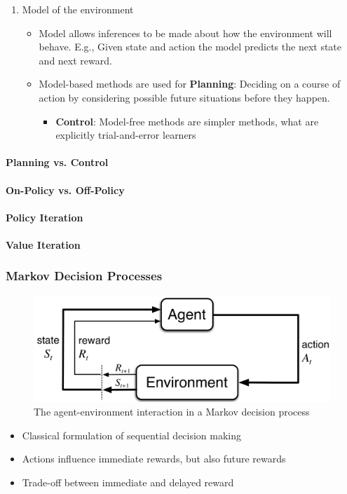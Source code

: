 \documentclass[a4paper, twoside, 12pt]{article}
\let\cite\shortcite
\begin{document}
\begin{enumerate}
\begin{itemize}
\end{itemize}
\item Model of the environment
\label{sec:orgb3d1f06}
\begin{itemize}
\item Model allows inferences to be made about how the environment will behave.
E.g., Given state and action the model predicts the next state and next reward.
\item Model-based methods are used for \textbf{\textbf{Planning}}: Deciding on a course of action by
considering possible future situations before they happen.
\begin{itemize}
\item \textbf{\textbf{Control}}: Model-free methods are simpler methods, what are explicitly trial-and-error learners
\end{itemize}
\end{itemize}
\end{enumerate}
\paragraph{Planning vs. Control}
\label{sec:orgac272c3}
\paragraph{On-Policy vs. Off-Policy}
\label{sec:org36ad234}
\paragraph{Policy Iteration}
\label{sec:org6d44c7d}
\paragraph{Value Iteration}
\label{sec:orgaf9ff44}
\subsubsection{Markov Decision Processes}
\label{sec:orgaf448b5}

\begin{figure}[htbp]
\centering
\includegraphics[width=.9\linewidth]{./img/mdp_interaction.png}
\caption[Markov Decision Process]{The agent-environment interaction in a Markov decision process \cite{sutton18_reinf}}
\end{figure}
\begin{itemize}
\item Classical formulation of sequential decision making
\item Actions influence immediate rewards, but also future rewards
\item Trade-off between immediate and delayed reward
\end{itemize}
\end{document}

